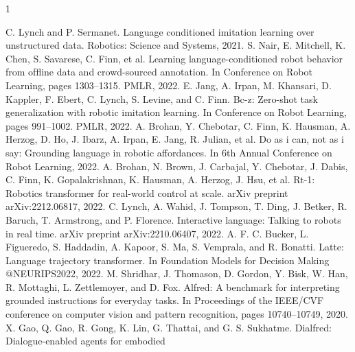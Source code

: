\documentclass[journal]{IEEEtran}
\begin{document}
%
%
%
\begin{thebibliography}{1}

   C. Lynch and P. Sermanet. Language conditioned imitation learning over unstructured data. Robotics: Science and
  Systems, 2021.
   S. Nair, E. Mitchell, K. Chen, S. Savarese, C. Finn, et al. Learning language-conditioned robot behavior from ofﬂine
  data and crowd-sourced annotation. In Conference on Robot Learning, pages 1303–1315. PMLR, 2022.
   E. Jang, A. Irpan, M. Khansari, D. Kappler, F. Ebert, C. Lynch, S. Levine, and C. Finn. Bc-z: Zero-shot task generalization with robotic imitation learning. In Conference on Robot Learning, pages 991–1002. PMLR, 2022.
   A. Brohan, Y. Chebotar, C. Finn, K. Hausman, A. Herzog, D. Ho, J. Ibarz, A. Irpan, E. Jang, R. Julian, et al. Do as i
  can, not as i say: Grounding language in robotic affordances. In 6th Annual Conference on Robot Learning, 2022.
   A. Brohan, N. Brown, J. Carbajal, Y. Chebotar, J. Dabis, C. Finn, K. Gopalakrishnan, K. Hausman, A. Herzog, J. Hsu,
  et al. Rt-1: Robotics transformer for real-world control at scale. arXiv preprint arXiv:2212.06817, 2022.
   C. Lynch, A. Wahid, J. Tompson, T. Ding, J. Betker, R. Baruch, T. Armstrong, and P. Florence. Interactive language:
  Talking to robots in real time. arXiv preprint arXiv:2210.06407, 2022.
   A. F. C. Bucker, L. Figueredo, S. Haddadin, A. Kapoor, S. Ma, S. Vemprala, and R. Bonatti. Latte: Language
  trajectory transformer. In Foundation Models for Decision Making @NEURIPS2022, 2022.
   M. Shridhar, J. Thomason, D. Gordon, Y. Bisk, W. Han, R. Mottaghi, L. Zettlemoyer, and D. Fox. Alfred: A benchmark
  for interpreting grounded instructions for everyday tasks. In Proceedings of the IEEE/CVF conference on computer
  vision and pattern recognition, pages 10740–10749, 2020.
   X. Gao, Q. Gao, R. Gong, K. Lin, G. Thattai, and G. S. Sukhatme. Dialfred: Dialogue-enabled agents for embodied

\end{thebibliography}
\end{document}
